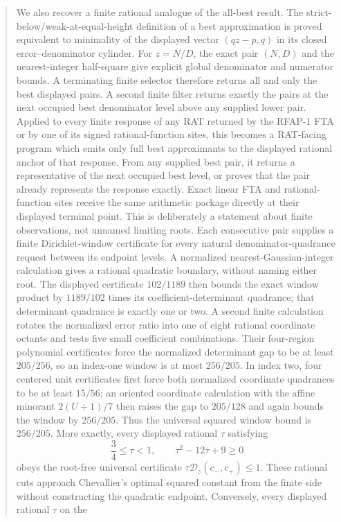 \documentclass[11pt]{article}
\begin{document}
\begin{abstract}
We also recover a finite rational analogue of the all-best result.  The
strict-below/weak-at-equal-height definition of a best approximation is
proved equivalent to minimality of the displayed vector $(qz-p,q)$ in its
closed error--denominator cylinder.  For $z=N/D$, the exact pair $(N,D)$ and
the nearest-integer half-square give explicit global denominator and
numerator bounds.  A terminating finite selector therefore returns all and
only the best displayed pairs.  A second finite filter returns exactly the
pairs at the next occupied best denominator level above any supplied lower
pair.  Applied to every finite response of any RAT returned by the RFAP-1
FTA or by one of its signed rational-function sites, this becomes a
RAT-facing program which emits only full best approximants to the displayed
rational anchor of that response.  From any supplied best pair, it returns a
representative of the next occupied best level, or proves that the pair
already represents the response exactly.  Exact linear FTA and
rational-function sites receive the same arithmetic package directly at
their displayed terminal point.  This is deliberately a statement about
finite observations, not unnamed limiting roots.
Each consecutive pair supplies a finite Dirichlet-window certificate
for every natural denominator-quadrance request between its endpoint levels.
A normalized nearest-Gaussian-integer calculation gives a rational quadratic
boundary, without naming either root.  The displayed certificate $102/1189$
then bounds the exact window product by $1189/102$ times its
coefficient-determinant quadrance; that determinant quadrance is exactly one
or two.  A second finite calculation rotates the normalized error ratio into
one of eight rational coordinate octants and tests five small coefficient
combinations.  Their four-region polynomial certificates force the
normalized determinant gap to be at least $205/256$, so an index-one window
is at most $256/205$.  In index two, four centered unit certificates first
force both normalized coordinate quadrances to be at least $15/56$; an
oriented coordinate calculation with the affine minorant $2(U+1)/7$ then
raises the gap to $205/128$ and again bounds the window by $256/205$.  Thus
the universal squared window bound is $256/205$.  More exactly, every
displayed rational $\tau$ satisfying
\[
 \frac34\le\tau<1,\qquad \tau^2-12\tau+9\ge0
\]
obeys the root-free universal certificate
$\tau\mathcal D_z(c_-,c_+)\le1$.  These rational cuts approach Chevallier's
optimal squared constant from the finite side without constructing the
quadratic endpoint.  Conversely, every displayed rational $\tau$ on the

\end{abstract}
\end{document}
